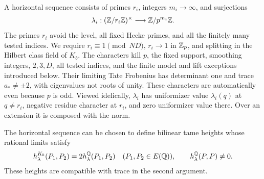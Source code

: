 A horizontal sequence consists of primes \(r_i\), integers
\(m_i\to\infty\), and surjections
\[
 \lambda_i:(\mathbb Z/r_i\mathbb Z)^\times\longrightarrow\mathbb Z/p^{m_i}\mathbb Z.
\]
The primes \(r_i\) avoid the level, all fixed Hecke primes, and
all the finitely many tested indices.
We require \(r_i\equiv1\pmod{ND}\), \(r_i\to1\) in \(\mathbb Z_p\),
and splitting in the Hilbert class field of \(K_b\).  The
characters kill \(p\), the fixed support, smoothing integers,
\(2,3,D\), all tested indices, and the finite model and lift
exceptions introduced below.  Their limiting Tate Frobenius
has determinant one and trace \(a_*\ne\pm2\), with eigenvalues
not roots of unity.  These characters are automatically even
because \(p\) is odd.  Viewed idelically, \(\lambda_i\) has
uniformizer value \(\lambda_i(q)\) at \(q\ne r_i\), negative
residue character at \(r_i\), and zero uniformizer value there.
Over an extension it is composed with the norm.

\begin{lemma}\label{single:height-direction}
The horizontal sequence can be chosen to define bilinear tame
heights whose rational limits satisfy
\[
 h_\lambda^{K_b}(P_1,P_2)=2h_\lambda^\mathbb Q(P_1,P_2)
 \quad(P_1,P_2\in E(\mathbb Q)),\qquad
 h_\lambda^\mathbb Q(P,P)\ne0.
\]
These heights are compatible with trace in the second argument.
\end{lemma}

